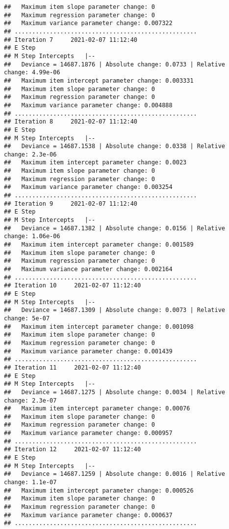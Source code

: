 \documentclass[
]{book}
\begin{document}
\begin{verbatim}
##   Maximum item slope parameter change: 0
##   Maximum regression parameter change: 0
##   Maximum variance parameter change: 0.007322
## ....................................................
## Iteration 7     2021-02-07 11:12:40
## E Step
## M Step Intercepts   |--
##   Deviance = 14687.1876 | Absolute change: 0.0733 | Relative change: 4.99e-06
##   Maximum item intercept parameter change: 0.003331
##   Maximum item slope parameter change: 0
##   Maximum regression parameter change: 0
##   Maximum variance parameter change: 0.004888
## ....................................................
## Iteration 8     2021-02-07 11:12:40
## E Step
## M Step Intercepts   |--
##   Deviance = 14687.1538 | Absolute change: 0.0338 | Relative change: 2.3e-06
##   Maximum item intercept parameter change: 0.0023
##   Maximum item slope parameter change: 0
##   Maximum regression parameter change: 0
##   Maximum variance parameter change: 0.003254
## ....................................................
## Iteration 9     2021-02-07 11:12:40
## E Step
## M Step Intercepts   |--
##   Deviance = 14687.1382 | Absolute change: 0.0156 | Relative change: 1.06e-06
##   Maximum item intercept parameter change: 0.001589
##   Maximum item slope parameter change: 0
##   Maximum regression parameter change: 0
##   Maximum variance parameter change: 0.002164
## ....................................................
## Iteration 10     2021-02-07 11:12:40
## E Step
## M Step Intercepts   |--
##   Deviance = 14687.1309 | Absolute change: 0.0073 | Relative change: 5e-07
##   Maximum item intercept parameter change: 0.001098
##   Maximum item slope parameter change: 0
##   Maximum regression parameter change: 0
##   Maximum variance parameter change: 0.001439
## ....................................................
## Iteration 11     2021-02-07 11:12:40
## E Step
## M Step Intercepts   |--
##   Deviance = 14687.1275 | Absolute change: 0.0034 | Relative change: 2.3e-07
##   Maximum item intercept parameter change: 0.00076
##   Maximum item slope parameter change: 0
##   Maximum regression parameter change: 0
##   Maximum variance parameter change: 0.000957
## ....................................................
## Iteration 12     2021-02-07 11:12:40
## E Step
## M Step Intercepts   |--
##   Deviance = 14687.1259 | Absolute change: 0.0016 | Relative change: 1.1e-07
##   Maximum item intercept parameter change: 0.000526
##   Maximum item slope parameter change: 0
##   Maximum regression parameter change: 0
##   Maximum variance parameter change: 0.000637
## ....................................................

\end{verbatim}
\end{document}
